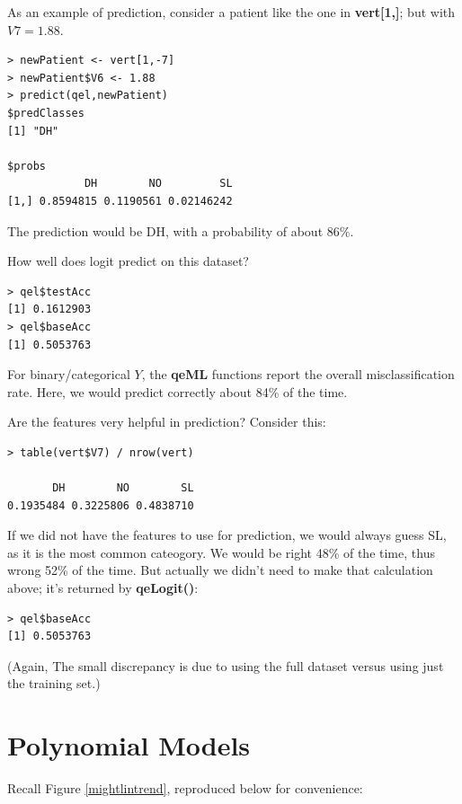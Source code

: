As an example of prediction, consider a patient like the one in
\textbf{vert[1,]}; but with $V7 = 1.88$.

\begin{lstlisting}
> newPatient <- vert[1,-7]
> newPatient$V6 <- 1.88
> predict(qel,newPatient)
$predClasses
[1] "DH"

$probs
            DH        NO         SL
[1,] 0.8594815 0.1190561 0.02146242
\end{lstlisting}

The prediction would be DH, with a probability of about 86\%.

How well does logit predict on this dataset?

\begin{lstlisting}
> qel$testAcc
[1] 0.1612903
> qel$baseAcc
[1] 0.5053763
\end{lstlisting}


For binary/categorical $Y$, the \textbf{qeML} functions report the
overall misclassification rate.  Here, we would predict correctly about
84\% of the time. 

Are the features very helpful in prediction?  Consider this:

\begin{lstlisting}
> table(vert$V7) / nrow(vert)

       DH        NO        SL 
0.1935484 0.3225806 0.4838710 
\end{lstlisting}

If we did not have the features to use for prediction, we would always
guess SL, as it is the most common cateogory.  We would be right 48\% of
the time, thus wrong 52\% of the time.  But actually we didn't need to
make that calculation above; it's returned by \textbf{qeLogit()}:

\begin{lstlisting}
> qel$baseAcc
[1] 0.5053763
\end{lstlisting}

(Again, The small discrepancy is due to using the full dataset versus
using just the training set.)

\section{Polynomial Models}

Recall Figure \ref{mightlintrend}, reproduced below for convenience:

